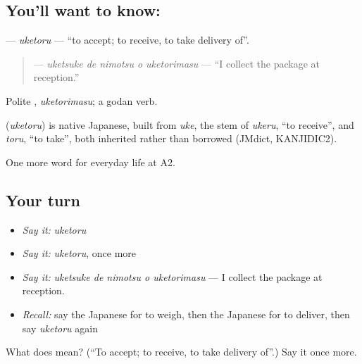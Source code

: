 \subsection*{You'll want to know: }
\textbf{} — \emph{uketoru} — \textquotedblleft{}to accept; to receive, to take delivery of\textquotedblright{}.

\begin{quote}
\textbf{  } — \emph{uketsuke de nimotsu o uketorimasu} — \textquotedblleft{}I collect the package at reception.\textquotedblright{}
\end{quote}

Polite \textbf{}, \emph{uketorimasu}; a godan verb.

\begin{cousinweb}
\textbf{} (\emph{uketoru}) is native Japanese, built from \emph{uke}, the stem of \emph{ukeru}, \textquotedblleft{}to receive\textquotedblright{}, and \emph{toru}, \textquotedblleft{}to take\textquotedblright{}, both inherited rather than borrowed (JMdict, KANJIDIC2).
\end{cousinweb}

\begin{grammarlens}[title={What you've built}]
One more word for everyday life at A2.
\end{grammarlens}

\subsection*{Your turn}
\begin{itemize}
\raggedright
  \item \emph{Say it:} \emph{uketoru}
  \item \emph{Say it:} \emph{uketoru}, once more
  \item \emph{Say it:} \emph{uketsuke de nimotsu o uketorimasu} — I collect the package at reception.
  \item \emph{Recall:} say the Japanese for to weigh, then the Japanese for to deliver, then say \emph{uketoru} again
\end{itemize}

\begin{tcolorbox}[breakable,colback=teal!4,colframe=teal!35!black,title={Before you move on}]
What does  mean? (\textquotedblleft{}To accept; to receive, to take delivery of\textquotedblright{}.) Say it once more.
\end{tcolorbox}

